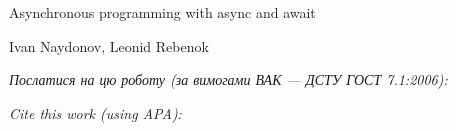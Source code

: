 \documentclass[a4paper,14pt]{extarticle}
\newcommand{\articleTitleUkr}{
Asynchronous programming with async and await}
\newcommand{\authorFullNameUkr}{Ivan Naydonov, Leonid Rebenok}
\begin{document}
\begin{center}\bf
\par\MakeUppercase\articleTitleUkr
\par\authorFullNameUkr
\end{center}

\par\bigskip\textit{Послатися на цю роботу (за вимогами ВАК --- ДСТУ ГОСТ 7.1:2006):}
\par{}
\par\bigskip\textit{Cite this work (using APA):}
\par{}

\end{document}
